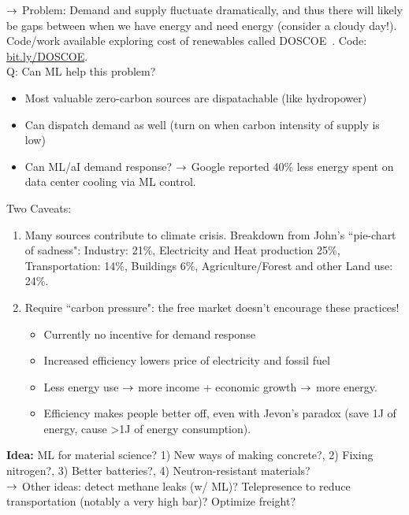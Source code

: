 $\rightarrow$ Problem: Demand and supply fluctuate dramatically, and thus there will likely be gaps between when we have energy and need energy (consider a cloudy day!).\\

Code/work available exploring cost of renewables called DOSCOE~\cite{platt2017analyzing}. Code: \url{bit.ly/DOSCOE}. \\

Q: Can ML help this problem?
\begin{itemize}
    \item Most valuable zero-carbon sources are dispatachable (like hydropower)
    \item Can dispatch demand as well (turn on when carbon intensity of supply is low)
    \item Can ML/aI demand response?
    $\rightarrow$ Google  reported 40\% less energy spent on data center cooling via ML control.
\end{itemize}

Two Caveats:
\begin{enumerate}
    \item Many sources contribute to climate crisis. Breakdown from John's ``pie-chart of sadness": Industry: 21\%, Electricity and Heat production 25\%, Transportation: 14\%, Buildings 6\%, Agriculture/Forest and other Land use: 24\%.
    
    \item Require ``carbon pressure": the free market doesn't encourage these practices!
    \begin{itemize}
        \item Currently no incentive for demand response
        \item Increased efficiency lowers price of electricity and fossil fuel
        \item Less energy use $\rightarrow$ more income + economic growth $\rightarrow$ more energy.
        \item Efficiency makes people better off, even with Jevon's paradox (save 1J of energy, cause >1J of energy consumption).
    \end{itemize}
\end{enumerate}

{\bf Idea:} ML for material science? 1) New ways of making concrete?, 2) Fixing nitrogen?, 3) Better batteries?, 4) Neutron-resistant materials? \\

$\rightarrow$ Other ideas: detect methane leaks (w/ ML)? Telepresence to reduce transportation (notably a very high bar)? Optimize freight?\\

